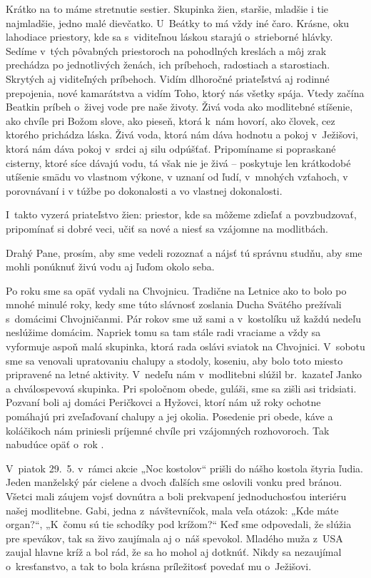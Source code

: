 Krátko na to máme stretnutie sestier. Skupinka žien, staršie, mladšie i tie najmladšie, jedno malé dievčatko. U~Beátky to má vždy iné čaro. Krásne, oku lahodiace priestory, kde sa s~viditeľnou láskou starajú o~strieborné hlávky.
Sedíme v~tých pôvabných priestoroch na pohodlných kreslách a môj zrak prechádza po jednotlivých ženách, ich príbehoch, radostiach a starostiach. Skrytých aj viditeľných príbehoch. Vidím dlhoročné priateľstvá aj rodinné prepojenia, nové kamarátstva a vidím Toho, ktorý nás všetky spája.
Vtedy začína Beatkin príbeh o~živej vode pre naše životy. Živá voda ako modlitebné stíšenie, ako chvíle pri Božom slove, ako pieseň, ktorá k~nám hovorí, ako človek, cez ktorého prichádza láska. Živá voda, ktorá nám dáva hodnotu a pokoj v~Ježišovi, ktorá nám dáva pokoj v~srdci aj silu odpúšťať.
Pripomíname si popraskané cisterny, ktoré síce dávajú vodu, tá však nie je živá -- poskytuje len krátkodobé utíšenie smädu vo vlastnom výkone, v uznaní od ľudí, v~mnohých vzťahoch, v porovnávaní i v túžbe po dokonalosti a vo vlastnej dokonalosti.

I~takto vyzerá priateľstvo žien: priestor, kde sa môžeme zdieľať a povzbudzovať, pripomínať si dobré veci, učiť sa nové a niesť sa vzájomne na modlitbách.

Drahý Pane, prosím, aby sme vedeli rozoznať a nájsť tú správnu studňu, aby sme mohli ponúknuť živú vodu aj ľuďom okolo seba.


Po roku sme sa opäť vydali na Chvojnicu. Tradične na Letnice ako to bolo po mnohé minulé roky, kedy sme túto slávnosť zoslania Ducha Svätého prežívali s~domácimi Chvojničanmi. Pár rokov sme už sami a v~kostolíku už každú nedeľu neslúžime domácim.
Napriek tomu sa tam stále radi vraciame a vždy sa vyformuje aspoň malá skupinka, ktorá rada oslávi sviatok na Chvojnici. V~sobotu sme sa venovali upratovaniu chalupy a stodoly, koseniu, aby bolo toto miesto pripravené na letné aktivity.
V~nedeľu nám v~modlitebni slúžil br.~kazateľ Janko a chválospevová skupinka. Pri spoločnom obede, guláši, sme sa zišli asi tridsiati. Pozvaní boli aj domáci Peričkovci a Hyžovci, ktorí nám už roky ochotne pomáhajú pri zveľaďovaní chalupy a jej okolia.
Posedenie pri obede, káve a koláčikoch nám priniesli príjemné chvíle pri vzájomných rozhovoroch. Tak nabudúce opäť o~rok \smiley.


V~piatok 29.~5. v~rámci akcie „Noc kostolov“ prišli do nášho kostola štyria ľudia. Jeden manželský pár cielene a dvoch ďalších sme oslovili vonku pred bránou. Všetci mali záujem vojsť dovnútra a boli prekvapení jednoduchosťou interiéru našej modlitebne.
Gabi, jedna z~návštevníčok, mala veľa otázok: „Kde máte organ?“, „K~čomu sú tie schodíky pod krížom?“ Keď sme odpovedali, že slúžia pre spevákov, tak sa živo zaujímala aj o~náš spevokol.
Mladého muža z~USA zaujal hlavne kríž a bol rád, že sa ho mohol aj dotknúť. Nikdy sa nezaujímal o~kresťanstvo, a tak to bola krásna príležitosť povedať mu o~Ježišovi.

